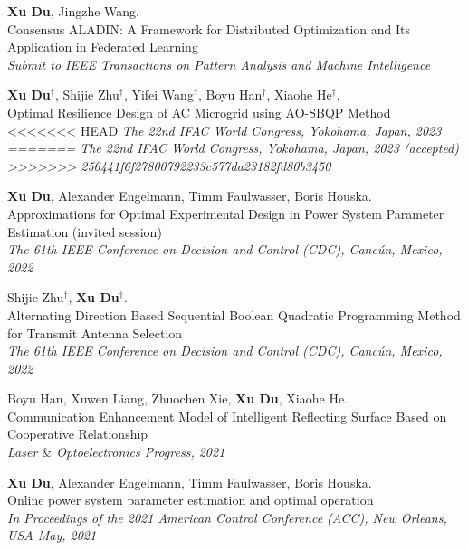 \documentclass[paper=a4,fontsize=11pt]{scrartcl} %
\begin{document}
\begin{itemize}
		\item  { \textbf{Xu Du}, Jingzhe Wang. \\
		{Consensus ALADIN: A Framework for
			Distributed Optimization and Its Application in
			Federated Learning}\\
		\emph{ Submit to IEEE Transactions on Pattern Analysis and Machine Intelligence
	} }
	
	
	\item  { \textbf{Xu Du}$^{\dag}$, Shijie Zhu$^{\dag}$, Yifei Wang$^{\dag}$, Boyu Han$^{\dag}$, Xiaohe He$^{\dag}$. \\
		{Optimal Resilience Design of AC Microgrid
			using AO-SBQP Method}\\
<<<<<<< HEAD
		\emph{ The 22nd IFAC World Congress, Yokohama, Japan, 2023
=======
		\emph{ The 22nd IFAC World Congress, Yokohama, Japan, 2023  (accepted)
>>>>>>> 256441f6f27800792233c577da23182fd80b3450
	} }
	
		\item  { \textbf{Xu Du}, Alexander Engelmann, Timm Faulwasser, Boris Houska. \\
		{Approximations for Optimal Experimental Design
			in Power System Parameter Estimation (invited session)}\\
		\emph{ The 61th IEEE Conference on Decision and Control (CDC), Canc\'un, Mexico, 2022
		} }
	
	
	\item  { Shijie Zhu$^{\dag}$, \textbf{Xu Du}$^{\dag}$. \\
		{Alternating Direction Based Sequential Boolean Quadratic Programming Method for Transmit Antenna Selection}\\
		\emph{ The 61th IEEE Conference on Decision and Control (CDC), Canc\'un, Mexico, 2022
	} }
	
		\item  { Boyu Han, Xuwen Liang, Zhuochen Xie, \textbf{Xu Du}, Xiaohe He. \\
		{Communication Enhancement Model of Intelligent Reflecting Surface Based on Cooperative Relationship}\\
		\emph{Laser $\&$ Optoelectronics Progress, 2021
	} }
	
	\item  { \textbf{Xu Du}, Alexander Engelmann, Timm Faulwasser, Boris Houska. \\
		{Online power system parameter estimation and optimal operation}\\
		\emph{In Proceedings of the 2021 American Control Conference (ACC), New Orleans, USA May, 2021
	} }
	
}
\end{itemize}
\end{document}
